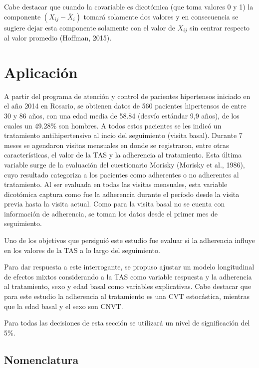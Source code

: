 \documentclass[spanish]{article}
\numberwithin{figure}{subsection}
\numberwithin{equation}{subsection}
\numberwithin{table}{subsection}
\def\npatients{560}
\begin{document}
Cabe destacar que cuando la covariable es dicotómica (que toma valores 0 y 1) la
componente $(X_{ij} - \overline{X}_i)$ tomará solamente dos valores y en
consecuencia se sugiere dejar esta componente solamente con el valor de $X_{ij}$
sin centrar respecto al valor promedio (Hoffman, 2015).

\newpage

\section{Aplicación}

A partir del programa de atención y control de pacientes hipertensos iniciado en
el año 2014 en Rosario, se obtienen datos de \npatients{} pacientes hipertensos
de entre 30 y 86 años, con una edad media de 58.84 (desvío estándar 9,9 años),
de los cuales un 49.28\% son hombres. A todos estos pacientes se les indicó un
tratamiento antihipertensivo al incio del seguimiento (visita basal). Durante 7
meses se agendaron visitas mensuales en donde se registraron, entre otras
características, el valor de la TAS y la adherencia al tratamiento. Esta última
variable surge de la evaluación del cuestionario Morisky (Morisky et al., 1986),
cuyo resultado categoriza a los pacientes como adherentes o no adherentes al
tratamiento. Al ser evaluada en todas las visitas mensuales, esta variable
dicotómica captura como fue la adherencia durante el período desde la visita
previa hasta la visita actual. Como para la visita basal no se cuenta con
información de adherencia, se toman los datos desde el primer mes de
seguimiento.

Uno de los objetivos que persiguió este estudio fue evaluar si la adherencia
influye en los valores de la TAS a lo largo del seguimiento.

Para dar respuesta a este interrogante, se propuso ajustar un modelo
longitudinal de efectos mixtos considerando a la TAS como variable respuesta y
la adherencia al tratamiento, sexo y edad basal como variables explicativas.
Cabe destacar que para este estudio la adherencia al tratamiento es una CVT
estocástica, mientras que la edad basal y el sexo son CNVT.

Para todas las decisiones de esta sección se utilizará un nivel de significación
del 5\%.

\subsection{Nomenclatura}
\label{variables}
\end{document}
